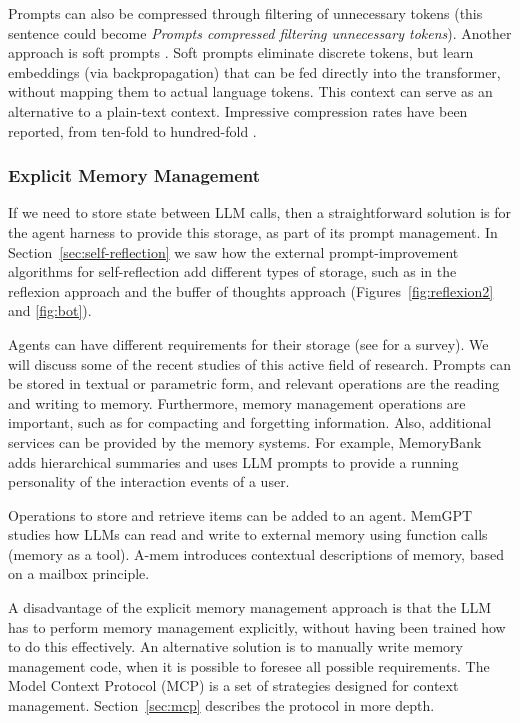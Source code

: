 Prompts can also be compressed through filtering of unnecessary tokens (this sentence could become {\em Prompts compressed filtering unnecessary tokens}). 
%
Another approach is soft prompts \citep{lester2021power}. 
%
Soft prompts eliminate discrete tokens, but  learn embeddings (via backpropagation) that can be fed directly into the transformer, without mapping them to actual language tokens. This context can serve as an alternative to a plain-text context. Impressive compression rates have been reported, from ten-fold \citep{mu2023learning} to hundred-fold \citep{li2025500xcompressor}.




\subsubsection{Explicit Memory Management}
If we need to store state between LLM calls, then a straightforward solution is for the agent harness to provide this storage, as part of its prompt management. In Section~\ref{sec:self-reflection} we saw how the external prompt-improvement algorithms for self-reflection add different types of storage, such as in the reflexion approach and the buffer of thoughts approach (Figures~\ref{fig:reflexion2} and \ref{fig:bot}). 

Agents can have different requirements for their storage (see \citet{zhang2025survey,chhikara2025mem0} for a survey). We will discuss some of the recent studies of this active field of research. Prompts can be stored in textual or parametric form, and relevant operations are the reading and writing to memory. Furthermore, memory management operations are important, such as for compacting and forgetting information. Also, additional services can be provided by the memory systems. For example, MemoryBank  \citep{zhong2024memorybank} adds hierarchical summaries and uses LLM prompts to provide a running personality of the interaction events of a user. 

Operations to store and retrieve items can be added to an agent. MemGPT \citep{packer2023memgpt} studies how LLMs can read and write to external memory using function calls (memory as a tool). %
A-mem \citep{xu2025mem} introduces contextual descriptions of memory, based on a mailbox principle.

A disadvantage of the explicit memory management approach is that the LLM has to perform memory management explicitly, without having been trained how to do this effectively. An alternative solution is to manually write memory management code, when it is possible to foresee all possible requirements. 
The Model Context Protocol (MCP) is a set of strategies designed for context management. Section~\ref{sec:mcp} describes the protocol in more depth. 


